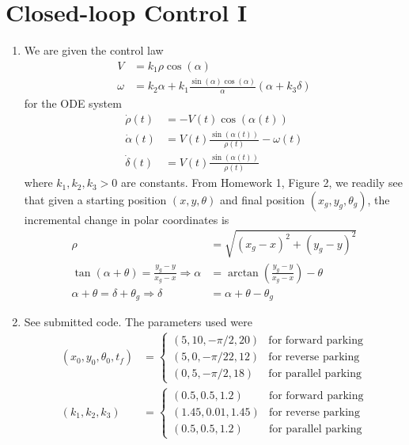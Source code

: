 \documentclass[12pt]{article}
\begin{document}
\section{Closed-loop Control I}
\begin{enumerate}
	\item We are given the control law
	\begin{align*}
		V &= k_1\rho\cos(\alpha) \\
		\omega &= k_2\alpha + k_1\frac{\sin(\alpha)\cos(\alpha)}{\alpha}(\alpha + k_3\delta)
	\end{align*}
	for the ODE system
	\begin{align*}
		\dot \rho(t) &= -V(t)\cos(\alpha(t)) \\
		\dot \alpha(t) &= V(t)\frac{\sin(\alpha(t))}{\rho(t)} - \omega(t) \\
		\dot \delta(t) &= V(t)\frac{\sin(\alpha(t))}{\rho(t)}
	\end{align*}
	where $k_1,k_2,k_3 > 0$ are constants. From Homework 1, Figure 2, we readily see that given a starting position $(x,y,\theta)$ and final position $(x_g,y_g,\theta_g)$, the incremental change in polar coordinates is
	\begin{align*}
		\rho &= \sqrt{(x_g - x)^2 + (y_g - y)^2} \\
		\tan(\alpha + \theta) = \frac{y_g - y}{x_g - x} \Rightarrow \alpha &= \arctan{\left(\frac{y_g - y}{x_g - x}\right)} - \theta \\
		\alpha + \theta = \delta + \theta_g \Rightarrow \delta &= \alpha + \theta - \theta_g
	\end{align*}
	\item See submitted code. The parameters used were
	\begin{align*}
		(x_0,y_0,\theta_0,t_f) &=
		\begin{cases}
			(5,10,-\pi/2,20) & \mbox{for forward parking} \\
			(5,0,-\pi/22,12) & \mbox{for reverse parking} \\
			(0,5,-\pi/2,18) & \mbox{for parallel parking}
		\end{cases} \\
		(k_1,k_2,k_3) &=
		\begin{cases}
			(0.5,0.5,1.2) & \mbox{for forward parking} \\
			(1.45,0.01,1.45) & \mbox{for reverse parking} \\
			(0.5,0.5,1.2) & \mbox{for parallel parking}
		\end{cases}
	\end{align*}

\end{enumerate}
\end{document}
